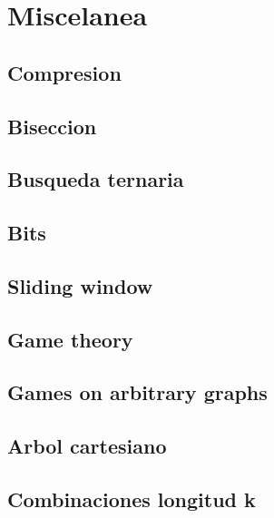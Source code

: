 \section{Miscelanea}
\subsection{Compresion}
\raggedbottom
\hrulefill
\subsection{Biseccion}
\raggedbottom
\hrulefill
\subsection{Busqueda ternaria}
\raggedbottom
\hrulefill
\subsection{Bits}
\raggedbottom
\hrulefill
\subsection{Sliding window}
\raggedbottom
\hrulefill
\subsection{Game theory}
\begingroup\setlength{\parindent}{0pt}\setlength{\parskip}{2pt}\par\endgroup
\hrulefill
\subsection{Games on arbitrary graphs}
\raggedbottom
\hrulefill
\subsection{Arbol cartesiano}
\raggedbottom
\hrulefill
\subsection{Combinaciones longitud k}
\raggedbottom
\hrulefill
